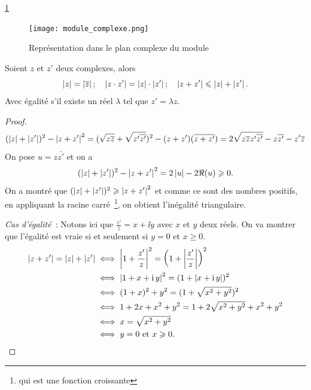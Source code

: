 \ref{fig:moduleComplexe}
\begin{figure}
    \centering
    \texttt{[image: module\_complexe.png]}
    \caption{Représentation dans le plan complexe du module}
    \label{fig:moduleComplexe}
\end{figure}
\begin{prop}
    Soient \(z\) et \(z'\) deux complexes, alors
    \begin{equation}
        \left\lvert z\right\rvert=\left\lvert\overline{z}\right\rvert; \quad \left\lvert z \cdot z'\right\rvert=\left\lvert z\right\rvert \cdot \left\lvert z'\right\rvert; 
        \quad \left\lvert z+z'\right\rvert\leqslant\left\lvert z\right\rvert+\left\lvert z'\right\rvert.
    \end{equation}
    Avec égalité s'il existe un réel \(\lambda\) tel que \(z'=\lambda z\).
\end{prop}
\begin{proof}
    \begin{equation}
        (\left\lvert z\right\rvert+\left\lvert z'\right\rvert)^2-\left\lvert z+z'\right\rvert^2
        =(\sqrt{z \overline{z}} +\sqrt{z' \overline{z'}})^2 - (z+z')(\overline{z+z'})
        =2 \sqrt{z \overline{z} z' \overline{z'}} - z \overline{z'} - z'\overline{z}
    \end{equation}
    On pose \(u=z \bar{z'}\) et on a
    \begin{equation}
        (\left\lvert z\right\rvert+\left\lvert z'\right\rvert)^2-\left\lvert z+z'\right\rvert^2=2 \left\lvert u\right\rvert-2 \Re(u) \geqslant 0.
    \end{equation}
    On a montré que \((\left\lvert z\right\rvert+\left\lvert z'\right\rvert)^2 \geqslant \left\lvert z+z'\right\rvert^2\) et comme ce 
    sont des nombres positifs, en appliquant la racine carré~\footnote{qui est 
    une fonction croissante}, on obtient l'inégalité triangulaire.

    \emph{Cas d'égalité}~: Notons ici que \(\frac{z'}{z}=x + \ii y\) avec \(x\) 
    et \(y\) deux réels. On va montrer que l'égalité est vraie si et seulement 
    si \(y=0\) et \(x \geqslant 0\).
    \begin{align}
        \left\lvert z+z'\right\rvert=\left\lvert z\right\rvert+\left\lvert z'\right\rvert &\iff 
        \left\lvert1+\frac{z'}{z}\right\rvert^2=\left(1+\left\lvert\frac{z'}{z}\right\rvert\right)^2 \\
                                    &\iff \left\lvert1+x+\operatorname{i} y\right\rvert^2 = (1+ \left\lvert x+ \operatorname{i} 
                                    y\right\rvert)^2 \\
                                    &\iff (1+x)^2+y^2 = (1+\sqrt{x^2+y^2})^2 \\
                                    &\iff 1+2x+x^2+y^2 = 1 + 2\sqrt{x^2+y^2} + 
                                    x^2+y^2 \\
                                    &\iff x = \sqrt{x^2+y^2}\\
                                    &\iff y=0 \text{~et~} x \geqslant 0.
    \end{align}
\end{proof}
